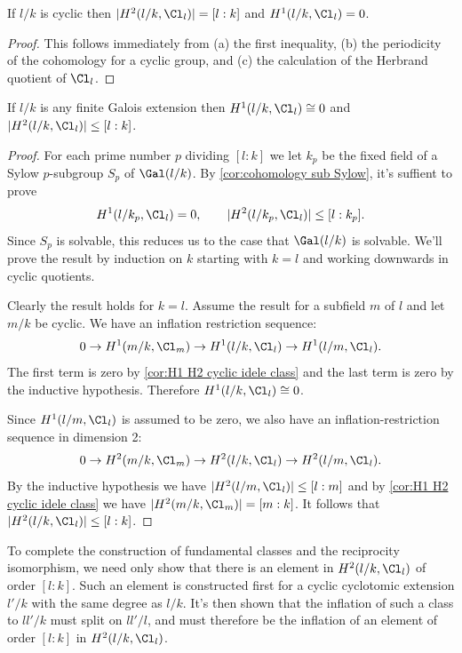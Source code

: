 \begin{corollary} \label{cor:H1 H2 cyclic idele class}
	If $l/k$ is cyclic then $|H^2(l/k, \Cl_{l})| = [l:k]$ and $H^1(l/k, \Cl_{l}) = 0$.
\end{corollary}

\begin{proof}
	This follows immediately from (a) the first inequality, (b) the periodicity of
	the cohomology for a cyclic group, and (c) the calculation of the Herbrand quotient
	of $\Cl_{l}$.
\end{proof}

\begin{theorem} \label{thm:global cohomology bound}
	If $l/k$ is any finite Galois extension then $H^1(l/k, \Cl_{l}) \cong 0$
	and $|H^2(l/k, \Cl_{l})| \le [l:k]$.
\end{theorem}


\begin{proof}
	For each prime number $p$ dividing $[l:k]$ we let $k_p$ be the fixed
	field of a Sylow $p$-subgroup $S_p$ of $\Gal(l/k)$.
	By \ref{cor:cohomology sub Sylow}, it's suffient to prove
	\[
		H^1(l/k_p, \Cl_{l}) = 0, \qquad
		|H^2(l/k_p, \Cl_{l})| \le [l:k_p].
	\]
	Since $S_p$ is solvable, this reduces us to the case that $\Gal(l/k)$ is solvable.
	We'll prove the result by induction on $k$ starting with $k=l$ and working downwards
	in cyclic quotients.

	Clearly the result holds for $k=l$.
	Assume the result for a subfield $m$ of $l$ and let $m/k$ be cyclic.
	We have an inflation restriction sequence:
	\[
		0 \to H^1(m/k, \Cl_{m}) \to H^1(l/k, \Cl_{l}) \to H^1(l/m,\Cl_{l}).
	\]
	The first term is zero by \ref{cor:H1 H2 cyclic idele class} and the last term is zero by
	the inductive hypothesis.
	Therefore $H^1(l/k,\Cl_l) \cong 0$.

	Since $H^1(l/m,\Cl_l)$ is assumed to be zero, we also have an inflation-restriction sequence
	in dimension 2:
	\[
		0 \to H^2(m/k, \Cl_m) \to H^2(l/k, \Cl_l) \to H^2(l/m,\Cl_l).
	\]
	By the inductive hypothesis we have $|H^2(l/m,\Cl_l)| \le [l:m]$
	and by \ref{cor:H1 H2 cyclic idele class} we have $|H^2(m/k, \Cl_m)| = [m : k]$.
	It follows that $|H^2(l/k,\Cl_l)| \le [l : k]$.
\end{proof}


To complete the construction of fundamental classes and the reciprocity isomorphism,
we need only show that there is an element in $H^2(l/k,\Cl_l)$ of order $[l:k]$.
Such an element is constructed first for a cyclic cyclotomic extension $l'/k$ with the same degree
as $l/k$.
It's then shown that the inflation of such a class to $ll'/k$ must split on $ll'/l$,
and must therefore be the inflation of an element of order $[l:k]$ in $H^2(l/k,\Cl_l)$.


